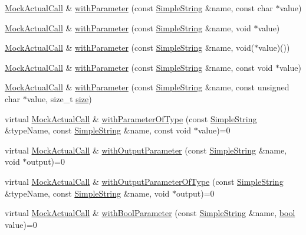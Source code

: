 \begin{DoxyCompactItemize}
\item 
\hyperlink{class_mock_actual_call}{Mock\+Actual\+Call} \& \hyperlink{class_mock_actual_call_ab299726011d5c80eabc64589a07caab4}{with\+Parameter} (const \hyperlink{class_simple_string}{Simple\+String} \&name, const char $\ast$value)
\item 
\hyperlink{class_mock_actual_call}{Mock\+Actual\+Call} \& \hyperlink{class_mock_actual_call_a73f6c72584163c0853b8c76b61f5d8d2}{with\+Parameter} (const \hyperlink{class_simple_string}{Simple\+String} \&name, void $\ast$value)
\item 
\hyperlink{class_mock_actual_call}{Mock\+Actual\+Call} \& \hyperlink{class_mock_actual_call_a2179debe76f390842cb8f94786273f8d}{with\+Parameter} (const \hyperlink{class_simple_string}{Simple\+String} \&name, void($\ast$value)())
\item 
\hyperlink{class_mock_actual_call}{Mock\+Actual\+Call} \& \hyperlink{class_mock_actual_call_a3d3f4588e0e927961590b55e117e898f}{with\+Parameter} (const \hyperlink{class_simple_string}{Simple\+String} \&name, const void $\ast$value)
\item 
\hyperlink{class_mock_actual_call}{Mock\+Actual\+Call} \& \hyperlink{class_mock_actual_call_a59ab8948e17207f3bb15facb8869e266}{with\+Parameter} (const \hyperlink{class_simple_string}{Simple\+String} \&name, const unsigned char $\ast$value, size\+\_\+t \hyperlink{gst__avb__playbin_8c_a439227feff9d7f55384e8780cfc2eb82}{size})
\item 
virtual \hyperlink{class_mock_actual_call}{Mock\+Actual\+Call} \& \hyperlink{class_mock_actual_call_ad361afca601fb452b7182433f5727976}{with\+Parameter\+Of\+Type} (const \hyperlink{class_simple_string}{Simple\+String} \&type\+Name, const \hyperlink{class_simple_string}{Simple\+String} \&name, const void $\ast$value)=0
\item 
virtual \hyperlink{class_mock_actual_call}{Mock\+Actual\+Call} \& \hyperlink{class_mock_actual_call_a1447eda6e2bb53a711a6873b007ccd0a}{with\+Output\+Parameter} (const \hyperlink{class_simple_string}{Simple\+String} \&name, void $\ast$output)=0
\item 
virtual \hyperlink{class_mock_actual_call}{Mock\+Actual\+Call} \& \hyperlink{class_mock_actual_call_ae3745a2c655cde04e7068bc19e9d30f5}{with\+Output\+Parameter\+Of\+Type} (const \hyperlink{class_simple_string}{Simple\+String} \&type\+Name, const \hyperlink{class_simple_string}{Simple\+String} \&name, void $\ast$output)=0
\item 
virtual \hyperlink{class_mock_actual_call}{Mock\+Actual\+Call} \& \hyperlink{class_mock_actual_call_a298a4dab743c253b66c33dad235b842d}{with\+Bool\+Parameter} (const \hyperlink{class_simple_string}{Simple\+String} \&name, \hyperlink{avb__gptp_8h_af6a258d8f3ee5206d682d799316314b1}{bool} value)=0

\end{DoxyCompactItemize}
